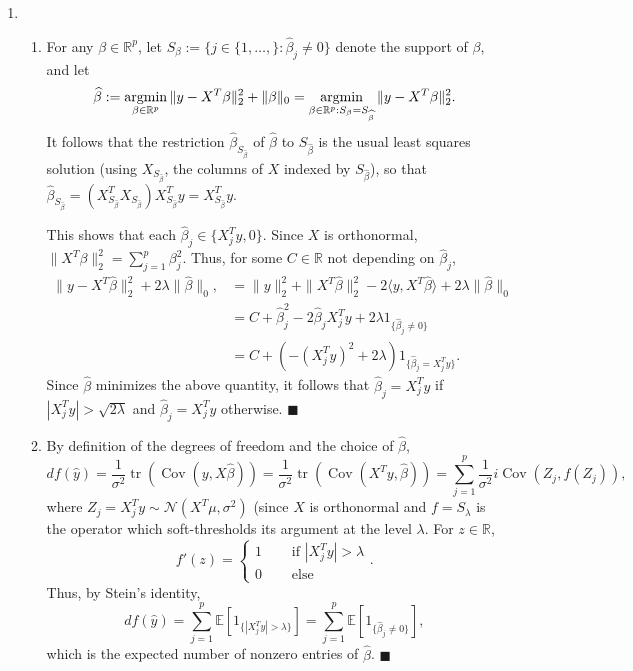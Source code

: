 \documentclass[11pt]{article}
\renewcommand{\qed}{\quad \ensuremath{\blacksquare}}
\newcommand{\E}{\mathbb{E}} %
\newcommand{\Cov}{\operatorname{Cov}} %
\newcommand{\R}{\mathbb{R}} %
\newcommand{\tr}{\operatorname{tr}} %
\renewcommand{\hat}{\widehat}
\newcommand{\argmin}{\operatornamewithlimits{argmin}}
\begin{document}
\begin{enumerate}
\newpage
\item
\begin{enumerate}
\item For any $\beta \in \R^p$, let
$S_\beta := \{j \in \{1,\dots,\} : \hat\beta_j \neq 0\}$ denote the support of
$\beta$, and let
\[\hat\beta := \argmin_{\beta \in \R^p} \|y - X^T \beta\|_2^2 + \|\beta\|_0
    = \argmin_{\beta \in \R^p : S_\beta = S_{\hat\beta}} \|y - X^T \beta\|_2^2.\]
It follows that the restriction $\hat\beta_{S_{\hat\beta}}$ of $\hat\beta$ to
$S_{\hat\beta}$ is the usual least squares solution (using $X_{S_{\hat\beta}}$,
the columns of $X$ indexed by $S_{\hat\beta}$), so that
$\hat\beta_{S_{\hat\beta}}
    = (X_{S_{\hat\beta}}^T X_{S_{\hat\beta}}) X_{S_{\hat\beta}}^T y
    = X_{S_{\hat\beta}}^T y$.

This shows that each $\hat\beta_j \in \{X_j^T y, 0\}$. Since $X$ is
orthonormal, $\|X^T \beta\|_2^2 = \sum_{j = 1}^p \beta_j^2$. Thus, for some
$C \in \R$ not depending on $\hat\beta_j$,
\begin{align*}
\|y - X^T \hat\beta\|_2^2 + 2\lambda \|\hat\beta\|_0,
 &  = \|y\|_2^2 + \|X^T \hat\beta\|_2^2 - 2\langle y, X^T \hat\beta \rangle
                                                + 2\lambda \|\hat\beta\|_0  \\
 &  = C + \hat\beta_j^2 - 2 \hat\beta_j X_j^T y
                                    + 2\lambda 1_{\{\hat\beta_j \neq 0\}}   \\
 &  = C + \left( -(X_j^T y)^2 + 2\lambda \right) 1_{\{\hat\beta_j = X_j^T y\}}.
\end{align*}
Since $\hat\beta$ minimizes the above quantity, it follows that
$\hat\beta_j = X_j^T y$ if $|X_j^T y| > \sqrt{2\lambda}$ and
$\hat\beta_j = X_j^T y$ otherwise. \qed

\item By definition of the degrees of freedom and the choice of $\hat\beta$,
\[df(\hat y)
    = \frac{1}{\sigma^2} \tr(\Cov(y,X\hat\beta))
    = \frac{1}{\sigma^2} \tr(\Cov(X^Ty,\hat\beta))
    = \sum_{j = 1}^p \frac{1}{\sigma^2}i \Cov(Z_j,f(Z_j)),
\]
where $Z_j = X_j^T y \sim \mathcal{N}(X^T \mu, \sigma^2)$ (since $X$ is
orthonormal and $f = S_\lambda$ is the operator which soft-thresholds its
argument at the level $\lambda$. For $z \in \R$,
\[f'(z)
    = \left\{
        \begin{array}{ll}
            1 \quad & \mbox{ if } |X_j^Ty| > \lambda \\
            0 \quad & \mbox{ else }
        \end{array}
    \right..\]
Thus, by Stein's identity,
\[df(\hat y)
    = \sum_{j = 1}^p \E\left[ 1_{\{|X_j^T y| > \lambda\}} \right]
    = \sum_{j = 1}^p \E\left[ 1_{\{\hat\beta_j \neq 0\}} \right],
\]
which is the expected number of nonzero entries of $\hat\beta$. \qed
\end{enumerate}


\end{enumerate}
\end{document}
